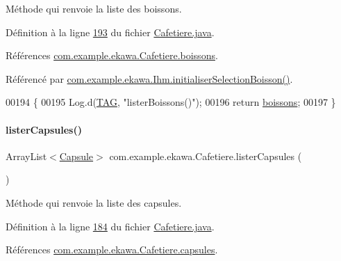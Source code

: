Méthode qui renvoie la liste des boissons. 



Définition à la ligne \hyperlink{_cafetiere_8java_source_l00193}{193} du fichier \hyperlink{_cafetiere_8java_source}{Cafetiere.\+java}.



Références \hyperlink{_cafetiere_8java_source_l00086}{com.\+example.\+ekawa.\+Cafetiere.\+boissons}.



Référencé par \hyperlink{_ihm_8java_source_l00470}{com.\+example.\+ekawa.\+Ihm.\+initialiser\+Selection\+Boisson()}.


\begin{DoxyCode}
00194     \{
00195         Log.d(\hyperlink{classcom_1_1example_1_1ekawa_1_1_cafetiere_aa0c1fd99a2508b06c462aea17034aa91}{TAG}, \textcolor{stringliteral}{"listerBoissons()"});
00196         \textcolor{keywordflow}{return} \hyperlink{classcom_1_1example_1_1ekawa_1_1_cafetiere_aad375efbc01f1db83572f4ae567189de}{boissons};
00197     \}
\end{DoxyCode}
\mbox{\label{classcom_1_1example_1_1ekawa_1_1_cafetiere_a86149d999dc196c3d97c855be0073e99}} 
\paragraph{\texorpdfstring{lister\+Capsules()}{listerCapsules()}}
{\footnotesize\ttfamily Array\+List$<$\hyperlink{classcom_1_1example_1_1ekawa_1_1_capsule}{Capsule}$>$ com.\+example.\+ekawa.\+Cafetiere.\+lister\+Capsules (\begin{DoxyParamCaption}{ }\end{DoxyParamCaption})}



Méthode qui renvoie la liste des capsules. 



Définition à la ligne \hyperlink{_cafetiere_8java_source_l00184}{184} du fichier \hyperlink{_cafetiere_8java_source}{Cafetiere.\+java}.



Références \hyperlink{_cafetiere_8java_source_l00085}{com.\+example.\+ekawa.\+Cafetiere.\+capsules}.



